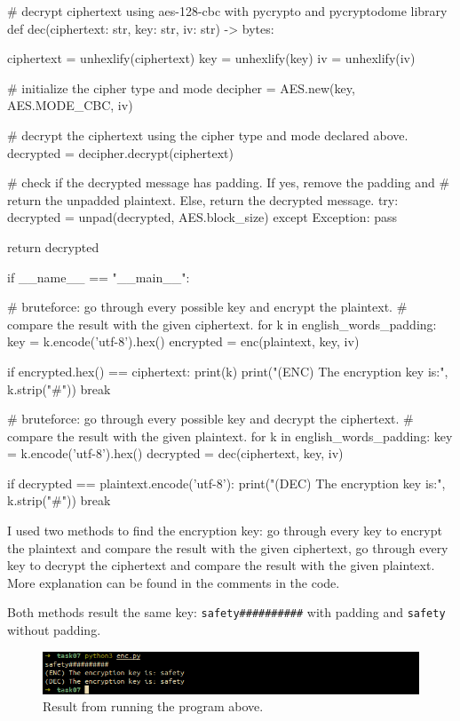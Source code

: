 \documentclass{article}
\begin{document}
\begin{python}
# decrypt ciphertext using aes-128-cbc with pycrypto and pycryptodome library
def dec(ciphertext: str, key: str, iv: str) -> bytes:

    ciphertext = unhexlify(ciphertext)
    key = unhexlify(key)
    iv = unhexlify(iv)

    # initialize the cipher type and mode
    decipher = AES.new(key, AES.MODE_CBC, iv)

    # decrypt the ciphertext using the cipher type and mode declared above.
    decrypted = decipher.decrypt(ciphertext)

    # check if the decrypted message has padding. If yes, remove the padding and
    # return the unpadded plaintext. Else, return the decrypted message.
    try:
        decrypted = unpad(decrypted, AES.block_size)
    except Exception:
        pass

    return decrypted


if __name__ == "__main__":

    # bruteforce: go through every possible key and encrypt the plaintext.
    # compare the result with the given ciphertext.
    for k in english_words_padding:
        key = k.encode('utf-8').hex()
        encrypted = enc(plaintext, key, iv)

        if encrypted.hex() == ciphertext:
            print(k)
            print("(ENC) The encryption key is:", k.strip("#"))
            break

    # bruteforce: go through every possible key and decrypt the ciphertext.
    # compare the result with the given plaintext.
    for k in english_words_padding:
        key = k.encode('utf-8').hex()
        decrypted = dec(ciphertext, key, iv)

        if decrypted == plaintext.encode('utf-8'):
            print("(DEC) The encryption key is:", k.strip("#"))
            break
\end{python}

I used two methods to find the encryption key: go through every key to encrypt
the plaintext and compare the result with the given ciphertext, go through
every key to decrypt the ciphertext and compare the result with the given
plaintext. More explanation can be found in the comments in the code.

Both methods result the same key: \texttt{safety\#\#\#\#\#\#\#\#\#\#} with padding
and \texttt{safety} without padding.

\begin{figure}[!ht]
    \centering
    \includegraphics[scale=0.68]{task07.png}
    \caption{Result from running the program above.}
\end{figure}
\end{document}
